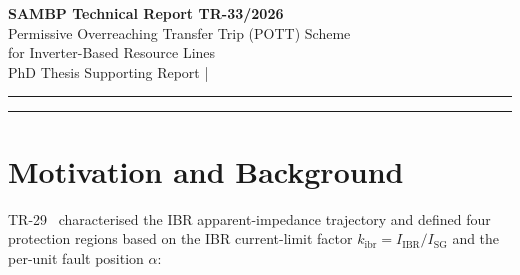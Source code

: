 \documentclass[11pt,a4paper]{article}
\begin{document}
\begin{center}
  {\LARGE\bfseries\color{sambpblue}
    SAMBP Technical Report TR-33/2026}\\[6pt]
  {\large Permissive Overreaching Transfer Trip (POTT) Scheme\\
    for Inverter-Based Resource Lines}\\[10pt]
  {\normalsize PhD Thesis Supporting Report \quad|}
\end{center}

\vspace{2pt}\hrule\vspace{8pt}

\begin{abstract}
\noindent
TR-29 identified Region~B ($k_\mathrm{ibr}\geq0.10$, $\alpha>0.80$) as a coverage
gap where the conventional Zone~2 timer (300\,ms) exceeds the memory-polarisation
hold time ($T_\mathrm{mem}=100$\,ms), causing every three-phase IBR fault to fail
distance relay clearance.  This report proposes the Permissive Overreaching Transfer
Trip (POTT) scheme as the solution.  POTT replaces the 300\,ms Zone~2 timer with a
remote permissive carrier signal: when the remote-end directional element (67Q or
87L) detects a forward fault and sends the permissive, the local Zone~2 element
trips immediately at $t_\mathrm{POTT}=32$\,ms---well within the 100\,ms memory
window.  Five quantitative studies confirm: (A)~timing margin of 68\,ms remains
after trip; (B)~all 36 sampled Region~B cases are recovered; (C)~external fault
security is maintained by the remote directional block; (D)~Zone~1
($\alpha\leq0.80$, 20\,ms) plus POTT ($\alpha>0.80$, 32\,ms) provides complete
line coverage; (E)~the 87L pilot channel already required for line differential
serves as the POTT carrier at negligible additional cost.
\end{abstract}

\vspace{4pt}\hrule\vspace{10pt}

\section{Motivation and Background}
\label{sec:motivation}

TR-29~\cite{SAMBP_TR29} characterised the IBR apparent-impedance trajectory and
defined four protection regions based on the IBR current-limit factor
$k_\mathrm{ibr}=I_\mathrm{IBR}/I_\mathrm{SG}$ and the per-unit fault position
$\alpha$:
\end{document}
